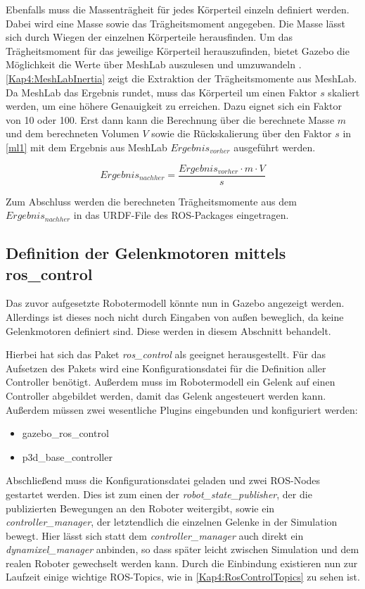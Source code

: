 Ebenfalls muss die Massenträgheit für jedes Körperteil einzeln definiert werden. Dabei wird eine Masse sowie das Trägheitsmoment angegeben. Die Masse lässt sich durch Wiegen der einzelnen Körperteile herausfinden. Um das Trägheitsmoment für das jeweilige Körperteil herauszufinden, bietet Gazebo die Möglichkeit die Werte über MeshLab auszulesen und umzuwandeln \autocite{gazebo-inertial}. \autoref{Kap4:MeshLabInertia} zeigt die Extraktion der Trägheitsmomente aus MeshLab. Da MeshLab das Ergebnis rundet, muss das Körperteil um einen Faktor $s$ skaliert werden, um eine höhere Genauigkeit zu erreichen. Dazu eignet sich ein Faktor von 10 oder 100. Erst dann kann die Berechnung über die berechnete Masse $m$ und dem berechneten Volumen $V$ sowie die Rückskalierung über den Faktor $s$ in \autoref{ml1} mit dem Ergebnis aus MeshLab $Ergebnis_{vorher}$ ausgeführt werden.

\begin{equation}
  Ergebnis_{nachher} = \frac{Ergebnis_{vorher} \cdot m \cdot V}{s}
\label{ml1}
\end{equation}

Zum Abschluss werden die berechneten Trägheitsmomente aus dem $Ergebnis_{nachher}$ in das \ac{URDF}-File des \ac{ROS}-Packages eingetragen.

\subsection{Definition der Gelenkmotoren mittels ros\_control}

Das zuvor aufgesetzte Robotermodell könnte nun in Gazebo angezeigt werden. Allerdings ist dieses noch nicht durch Eingaben von außen beweglich, da keine Gelenkmotoren definiert sind. Diese werden in diesem Abschnitt behandelt.

Hierbei hat sich das Paket \emph{ros\_control} als geeignet herausgestellt. Für das Aufsetzen des Pakets wird eine Konfigurationsdatei für die Definition aller Controller benötigt. Außerdem muss im Robotermodell ein Gelenk auf einen Controller abgebildet werden, damit das Gelenk angesteuert werden kann. Außerdem müssen zwei wesentliche Plugins eingebunden und konfiguriert werden:
\begin{itemize}
  \item gazebo\_ros\_control
  \item p3d\_base\_controller
\end{itemize}

Abschließend muss die Konfigurationsdatei geladen und zwei \ac{ROS}-Nodes gestartet werden. Dies ist zum einen der \emph{robot\_state\_publisher}, der die publizierten Bewegungen an den Roboter weitergibt, sowie ein \emph{controller\_manager}, der letztendlich die einzelnen Gelenke in der Simulation bewegt. Hier lässt sich statt dem \emph{controller\_manager} auch direkt ein \emph{dynamixel\_manager} anbinden, so dass später leicht zwischen Simulation und dem realen Roboter gewechselt werden kann. Durch die Einbindung existieren nun zur Laufzeit einige wichtige \ac{ROS}-Topics, wie in \autoref{Kap4:RosControlTopics} zu sehen ist.

